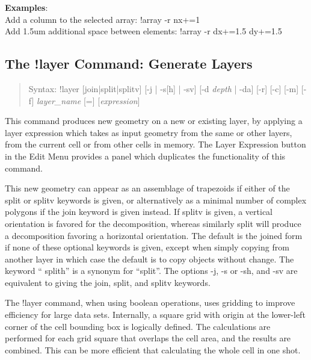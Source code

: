 \begin{description}
{\bf Examples}:\\
Add a column to the selected array:  {\vt !array -r nx+=1}\\
Add 1.5um additional space between elements: {\vt !array -r dx+=1.5 dy+=1.5}
\end{description}


\subsection{The {\cb !layer} Command: Generate Layers}
\label{layercmd}
\begin{quote}
Syntax: {\vt !layer [join|split|splitv] [-j | -s[h] | -sv]
 [-d {\it depth\/} | -da] [-r] [-c]
 [-m] [-f] {\it layer\_name} [=] [{\it expression\/}]}
\end{quote}
This command produces new geometry on a new or existing layer, by
applying a layer expression which takes as input geometry from the
same or other layers, from the current cell or from other cells in
memory.  The {\cb Layer Expression} button in the {\cb Edit Menu}
provides a panel which duplicates the functionality of this command.

This new geometry can appear as an assemblage of trapezoids if either
of the {\vt split} or {\vt splitv} keywords is given, or alternatively
as a minimal number of complex polygons if the {\vt join} keyword is
given instead.  If {\vt splitv} is given, a vertical orientation is
favored for the decomposition, whereas similarly {\vt split} will
produce a decomposition favoring a horizontal orientation.  The
default is the joined form if none of these optional keywords is
given, except when simply copying from another layer in which case the
default is to copy objects without change.  The keyword ``{\vt
splith}'' is a synonym for ``{\vt split}''.  The options {\vt -j},
{\vt -s} or {\vt -sh}, and {\vt -sv} are equivalent to giving the {\vt
join}, {\vt split}, and {\vt splitv} keywords.

The {\cb !layer} command, when using boolean operations, uses gridding
to improve efficiency for large data sets.  Internally, a square grid
with origin at the lower-left corner of the cell bounding box is
logically defined.  The calculations are performed for each grid
square that overlaps the cell area, and the results are combined. 
This can be more efficient that calculating the whole cell in one
shot.
 

